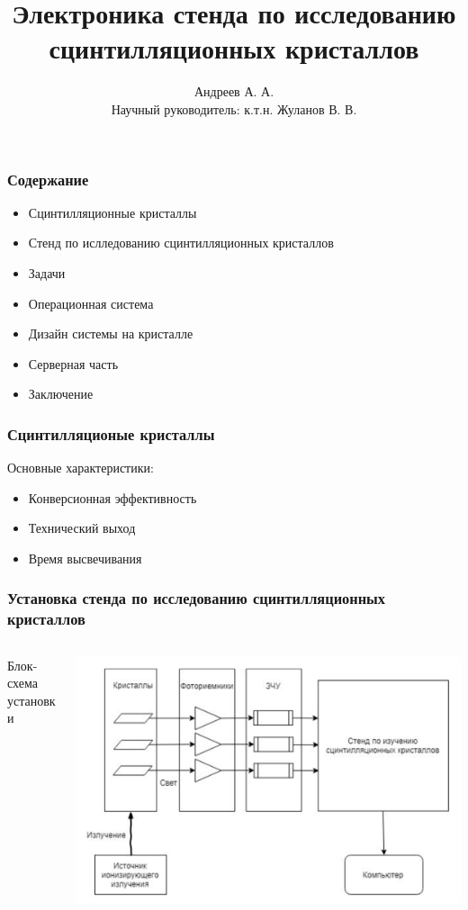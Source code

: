 \documentclass[aspectratio=169]{beamer}
\title{Электроника стенда по исследованию сцинтилляционных кристаллов}
\author{Андреев А. А. \\
        Научный руководитель: к.т.н. Жуланов В. В.}
\institute{Новосибирский Государственный Университет}
\begin{document}
\begin{frame}
\titlepage
\end{frame}

\begin{frame}
\frametitle{Содержание}
    \begin{itemize}  
        \item Сцинтилляционные кристаллы
        \item Стенд по ислледованию сцинтилляционных кристаллов
        \item Задачи
        \item Операционная система
        \item Дизайн системы на кристалле
        \item Серверная часть
        \item Заключение
    \end{itemize}
\end{frame}

\begin{frame}
\frametitle{Сцинтилляционые кристаллы}
    Основные характеристики:
    \begin{itemize}  
        \item Конверсионная эффективность
        \item Технический выход
        \item Время высвечивания 
    \end{itemize}
\end{frame}

\begin{frame}
\frametitle{Установка стенда по исследованию сцинтилляционных кристаллов}
    \begin{columns}
        \begin{column}{0.3\textwidth}
            Блок-схема установки
        \end{column}
        \begin{column}{0.7\textwidth}
            \includegraphics[width=\textwidth]{stand.jpg}
        \end{column}
    \end{columns}
\end{frame}
\end{document}
